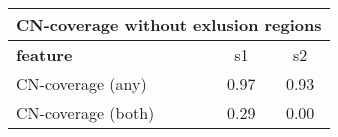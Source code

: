 \documentclass{standalone}
\begin{document}
\begin{tabular}{|l|c|c|}
\hline
\multicolumn{3}{|c|}{\textbf{CN-coverage without exlusion regions}}\\
\hline 

\textbf{feature} & s1 & s2 \\
\hline
CN-coverage (any) & 0.97 & 0.93 \\
CN-coverage (both) & 0.29 & 0.00 \\
\hline
\end{tabular}
\end{document}
